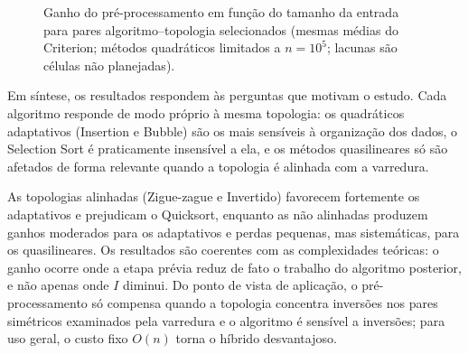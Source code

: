 \documentclass[12pt]{article}
\begin{document}
\begin{figure}[htbp]
\centering
{}
\caption{Ganho do pré-processamento em função do tamanho da entrada para pares algoritmo--topologia selecionados (mesmas médias do Criterion; métodos quadráticos limitados a $n{=}10^5$; lacunas são células não planejadas).}
\label{fig:ganho_n}
\end{figure}

Em síntese, os resultados respondem às perguntas que motivam o estudo. Cada algoritmo responde de modo próprio à mesma topologia: os quadráticos adaptativos (Insertion e Bubble) são os mais sensíveis à organização dos dados, o Selection Sort é praticamente insensível a ela, e os métodos quasilineares só são afetados de forma relevante quando a topologia é alinhada com a varredura.

As topologias alinhadas (Zigue-zague e Invertido) favorecem fortemente os adaptativos e prejudicam o Quicksort, enquanto as não alinhadas produzem ganhos moderados para os adaptativos e perdas pequenas, mas sistemáticas, para os quasilineares. Os resultados são coerentes com as complexidades teóricas: o ganho ocorre onde a etapa prévia reduz de fato o trabalho do algoritmo posterior, e não apenas onde $I$ diminui. Do ponto de vista de aplicação, o pré-processamento só compensa quando a topologia concentra inversões nos pares simétricos examinados pela varredura e o algoritmo é sensível a inversões; para uso geral, o custo fixo $O(n)$ torna o híbrido desvantajoso.
\end{document}
